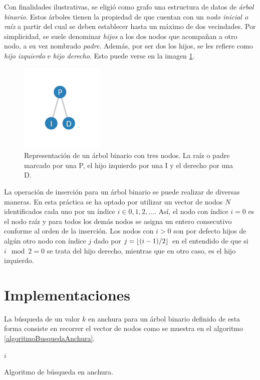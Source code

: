 \documentclass[paper=leter, fontsize=11pt]{scrartcl}
\numberwithin{equation}{section}		%
\numberwithin{figure}{section}			%
\numberwithin{table}{section}				%
\DeclarePairedDelimiter\floor{\lfloor}{\rfloor}
\begin{document}
Con finalidades ilustrativas, se eligió como grafo una estructura de datos de \textit{árbol binario}. Estos árboles tienen la propiedad de que cuentan con un \textit{nodo inicial o raíz} a partir del cual se deben establecer hasta un máximo de dos vecindades. Por simplicidad, se suele denominar \textit{hijos} a los dos nodos que acompañan a otro nodo, a su vez nombrado \textit{padre}. Además, por ser dos los hijos, se les refiere como \textit{hijo izquierdo} e \textit{hijo derecho}. Esto puede verse en la imagen \ref{arbolBinarioSimple}.

\begin{figure}
    \centering
    \includegraphics{arbolBinarioSimple.PNG}
    \caption{Representación de un árbol binario con tres nodos. La raíz o padre marcado por una P, el hijo izquierdo por una I y el derecho por una D.}
    \label{arbolBinarioSimple}
\end{figure}

La operación de inserción para un árbol binario se puede realizar de diversas maneras. En esta práctica se ha optado por utilizar un vector de nodos $N$ identificados cada uno por un índice $i \in {0, 1, 2, ...}$. Así, el nodo con índice $i = 0$ es el nodo raíz y para todos los demás nodos se asigna un entero consecutivo conforme al orden de la inserción. Los nodos con $i > 0$ son por defecto hijos de algún otro nodo con índice $j$ dado por \(j = \floor{(i - 1) / 2}\) en el entendido de que si $i \mod 2 = 0$ se trata del hijo derecho, mientras que en otro caso, es el hijo izquierdo.

\section{Implementaciones}

La búsqueda de un valor $k$ en anchura para un árbol binario definido de esta forma consiste en recorrer el vector de nodos como se muestra en el algoritmo \ref{algoritmoBusquedaAnchura}.

\begin{algorithm} %
	\SetAlgoLined
    \Return \(i\)

    \caption{Algoritmo de búsqueda en anchura.}
    \label{algoritmoBusquedaAnchura}
\end{algorithm}
\end{document}
